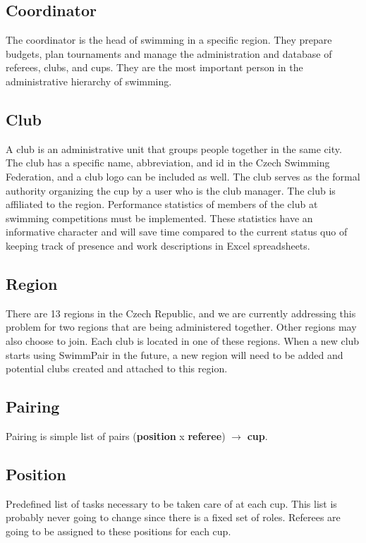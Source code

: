 \subsection*{Coordinator}
The coordinator is the head of swimming in a specific region. They prepare budgets, plan tournaments and manage the administration and database of referees, clubs, and cups. They are the most important person in the administrative hierarchy of swimming.
\subsection*{Club}
\par
A club is an administrative unit that groups people together in the same city. The club has a specific name, abbreviation, and id in the Czech Swimming Federation, and a club logo can be included as well. The club serves as the formal authority organizing the cup by a user who is the club manager. The club is affiliated to the region. Performance statistics of members of the club at swimming competitions must be implemented. These statistics have an informative character and will save time compared to the current status quo of keeping track of presence and work descriptions in Excel spreadsheets.
\subsection*{Region}
There are 13 regions in the Czech Republic, and we are currently addressing this problem for two regions that are being administered together. Other regions may also choose to join. Each club is located in one of these regions. When a new club starts using SwimmPair in the future, a new region will need to be added and potential clubs created and attached to this region.

\subsection*{Pairing}
Pairing is simple list of pairs (\textbf{position} x \textbf{referee}) $\rightarrow$ \textbf{cup}.
\subsection*{Position}
Predefined list of tasks necessary to be taken care of at each cup. This list is probably never going to change since there is a fixed set of roles. Referees are going to be assigned to these positions for each cup.
\newpage
